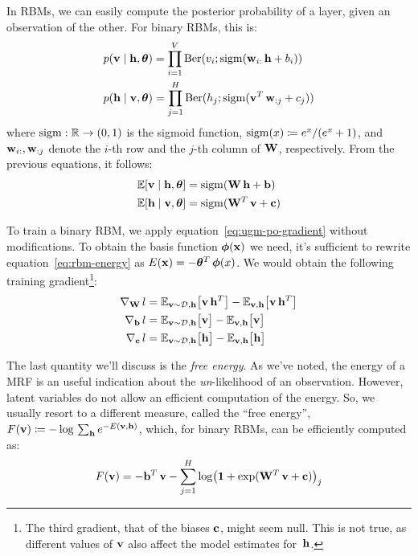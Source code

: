 In RBMs, we can easily compute the posterior probability of a layer, given an
observation of the other. For binary RBMs, this is:
\begin{equation}
	\begin{aligned}
		p(\mathbf{v} \mid \mathbf{h}, \bm{\theta}) &= \prod_{i=1}^V \operatorname{Ber}(v_i;
		\operatorname{sigm}(\mathbf{w}_{i:}\, \mathbf{h} + b_i)) \\
		p(\mathbf{h} \mid \mathbf{v}, \bm{\theta}) &= \prod_{j=1}^H \operatorname{Ber}(h_j;
		\operatorname{sigm}(\mathbf{v}^T\, \mathbf{w}_{:j} + c_j))
	\end{aligned}
	\label{eq:rbm-conditionals}
\end{equation}
where $\operatorname{sigm}: \mathbb{R} \to (0, 1)$ is the sigmoid function, $\operatorname{sigm}(x) \coloneqq
e^x/(e^x+1)$, and $\mathbf{w}_{i:}, \mathbf{w}_{:j}$ denote the $i$-th row and the
$j$-th column of $\mathbf{W}$, respectively.  From the previous equations, it
follows:
\begin{equation}
	\begin{aligned}
		\mathbb{E}[\mathbf{v}\mid \mathbf{h},\bm{\theta}] &= \operatorname{sigm}(\mathbf{W}\, \mathbf{h} + \mathbf{b}) \\
		\mathbb{E}[\mathbf{h}\mid \mathbf{v},\bm{\theta}] &= \operatorname{sigm}(\mathbf{W}^T\, \mathbf{v} + \mathbf{c})
	\end{aligned}
	\label{eq:rbm-expectations}
\end{equation}

To train a binary RBM, we apply equation~\eqref{eq:ugm-po-gradient} without
modifications. To obtain the basis function $\bm{\phi}(\mathbf{x})$ we need, it's
sufficient to rewrite equation~\eqref{eq:rbm-energy} as $E(\mathbf{x}) = -\bm{\theta}^T\,
\bm{\phi}(x)$. We would obtain the following training gradient\footnote{The
third gradient, that of the biases $\mathbf{c}$, might seem null. This is not
true, as different values of $\mathbf{v}$ also affect the model estimates
for~$\mathbf{h}$.}:
\begin{equation}
	\begin{aligned}
		\nabla_{\mathbf{W}}\,l &=
			\mathbb{E}_{\mathbf{v} \sim \mathcal{D},\mathbf{h}} \bigl[ \mathbf{v}\, \mathbf{h}^T \bigr] -
			\mathbb{E}_{\mathbf{v},\mathbf{h}} \bigl[ \mathbf{v}\, \mathbf{h}^T \bigr] \\
		\nabla_{\mathbf{b}}\,l &=
			\mathbb{E}_{\mathbf{v} \sim \mathcal{D},\mathbf{h}} \bigl[ \mathbf{v} \bigr] -
			\mathbb{E}_{\mathbf{v},\mathbf{h}} \bigl[ \mathbf{v} \bigr] \\
		\nabla_{\mathbf{c}}\,l &=
			\mathbb{E}_{\mathbf{v} \sim \mathcal{D},\mathbf{h}} \bigl[ \mathbf{h} \bigr] -
			\mathbb{E}_{\mathbf{v},\mathbf{h}} \bigl[ \mathbf{h} \bigr]
	\end{aligned}
	\label{eq:rbm-gradients}
\end{equation}

The last quantity we'll discuss is the \emph{free energy}. As we've noted, the
energy of a MRF is an useful indication about the \emph{un}-likelihood of an
observation. However, latent variables do not allow an efficient computation
of the energy. So, we usually resort to a different measure, called the ``free
energy'', $F(\mathbf{v}) \coloneqq - \log\, \sum_{\mathbf{h}} e^{-E(\mathbf{v}, \mathbf{h})}$, which, for
binary RBMs, can be efficiently computed as:
\begin{equation}
	F(\mathbf{v}) = - \mathbf{b}^T\, \mathbf{v} - \sum_{j=1}^H \log
		\bigl(\mathbf{1} + \exp(\mathbf{W}^T\, \mathbf{v} + \mathbf{c}) \bigr)_j
\end{equation}


